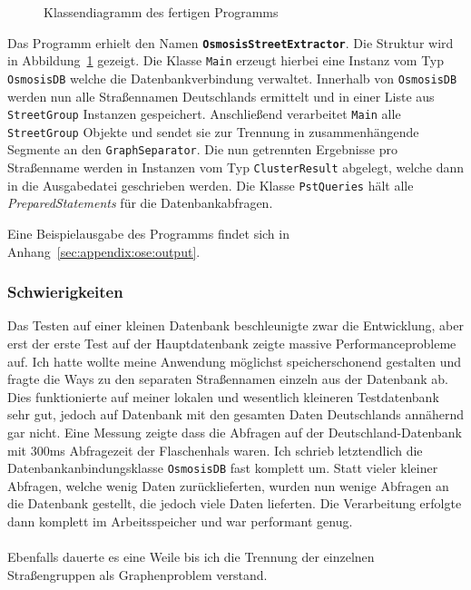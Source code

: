 \begin{figure}[htb]
   \centering
   \caption{Klassendiagramm des fertigen Programms}
   \label{fig:ose:uml}
 \end{figure}

Das Programm erhielt den Namen \textbf{\texttt{OsmosisStreetExtractor}}. Die Struktur wird in Abbildung~\ref{fig:ose:uml} gezeigt.
Die Klasse \texttt{Main} erzeugt hierbei eine Instanz vom Typ \texttt{OsmosisDB} welche die Datenbankverbindung verwaltet.
Innerhalb von \texttt{OsmosisDB} werden nun alle Straßennamen Deutschlands ermittelt und in einer Liste aus \texttt{StreetGroup} Instanzen gespeichert.
Anschließend verarbeitet \texttt{Main} alle \texttt{StreetGroup} Objekte und sendet sie zur Trennung in zusammenhängende Segmente an den \texttt{GraphSeparator}.
Die nun getrennten Ergebnisse pro Straßenname werden in Instanzen vom Typ \texttt{ClusterResult} abgelegt, welche dann in die Ausgabedatei geschrieben werden.
Die Klasse \texttt{PstQueries} hält alle \textit{PreparedStatements} für die Datenbankabfragen.

Eine Beispielausgabe des Programms findet sich in Anhang~\ref{sec:appendix:ose:output}.
   
\subsubsection{Schwierigkeiten}
Das Testen auf einer kleinen Datenbank beschleunigte zwar die Entwicklung, aber erst der erste Test auf der Hauptdatenbank zeigte massive Performanceprobleme auf.
Ich hatte wollte meine Anwendung möglichst speicherschonend gestalten und fragte die Ways zu den separaten Straßennamen  einzeln aus der Datenbank ab.
Dies funktionierte auf meiner lokalen und wesentlich kleineren Testdatenbank sehr gut, jedoch auf Datenbank mit den gesamten Daten Deutschlands annähernd gar nicht.
Eine Messung zeigte dass die Abfragen auf der Deutschland-Datenbank mit 300ms Abfragezeit der Flaschenhals waren.
Ich schrieb letztendlich die Datenbankanbindungsklasse \texttt{OsmosisDB} fast komplett um.
Statt vieler kleiner Abfragen, welche wenig Daten zurücklieferten, wurden nun wenige Abfragen an die Datenbank gestellt, die jedoch viele Daten lieferten.
Die Verarbeitung erfolgte dann komplett im Arbeitsspeicher und war performant genug.\\\\
Ebenfalls dauerte es eine Weile bis ich die Trennung der einzelnen Straßengruppen als Graphenproblem verstand.

